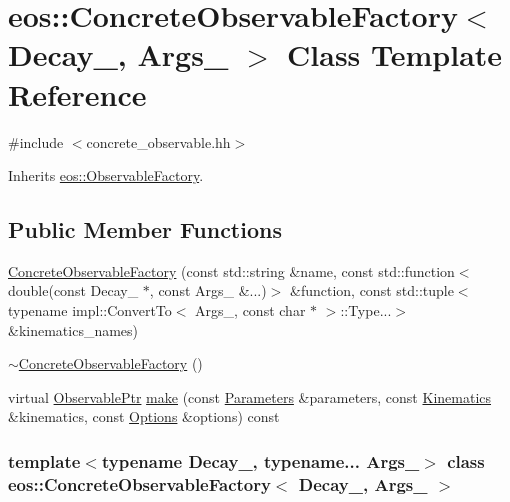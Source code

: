 \hypertarget{classeos_1_1ConcreteObservableFactory}{
\section{eos::ConcreteObservableFactory$<$ Decay\_\-, Args\_\- $>$ Class Template Reference}
\label{classeos_1_1ConcreteObservableFactory}
}


{\ttfamily \#include $<$concrete\_\-observable.hh$>$}

Inherits \hyperlink{classeos_1_1ObservableFactory}{eos::ObservableFactory}.\subsection*{Public Member Functions}
\begin{DoxyCompactItemize}
\item 
\hyperlink{classeos_1_1ConcreteObservableFactory_a56251553542fa722a00778c2f2040f1e}{ConcreteObservableFactory} (const std::string \&name, const std::function$<$ double(const Decay\_\- $\ast$, const Args\_\- \&...)$>$ \&function, const std::tuple$<$ typename impl::ConvertTo$<$ Args\_\-, const char $\ast$ $>$::Type...$>$ \&kinematics\_\-names)
\item 
\hyperlink{classeos_1_1ConcreteObservableFactory_a51f8f732c836a6ae924655c988c51490}{$\sim$ConcreteObservableFactory} ()
\item 
virtual \hyperlink{namespaceeos_a470e5dd806bd129080f1aa0c2954646f}{ObservablePtr} \hyperlink{classeos_1_1ConcreteObservableFactory_ace91bf102a1303e6efedaee0e8b2f8e6}{make} (const \hyperlink{classeos_1_1Parameters}{Parameters} \&parameters, const \hyperlink{classeos_1_1Kinematics}{Kinematics} \&kinematics, const \hyperlink{classeos_1_1Options}{Options} \&options) const 
\end{DoxyCompactItemize}
\subsubsection*{template$<$typename Decay\_\-, typename... Args\_\-$>$ class eos::ConcreteObservableFactory$<$ Decay\_\-, Args\_\- $>$}



